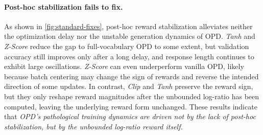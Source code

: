 \paragraph{Post-hoc stabilization fails to fix.}
As shown in \autoref{fig:standard-fixes}, post-hoc reward stabilization alleviates neither the optimization delay nor the unstable generation dynamics of OPD. \emph{Tanh} and \emph{Z-Score} reduce the gap to full-vocabulary OPD to some extent, but validation accuracy still improves only after a long delay, and response length continues to exhibit large oscillations. \emph{Z-Score} can even underperform vanilla OPD, likely because batch centering may change the sign of rewards and reverse the intended direction of some updates. In contrast, \emph{Clip} and \emph{Tanh} preserve the reward sign, but they only reshape reward magnitudes after the unbounded log-ratio has been computed, leaving the underlying reward form unchanged. These results indicate that \emph{OPD's pathological training dynamics are driven not by the lack of post-hoc stabilization, but by the unbounded log-ratio reward itself.}



